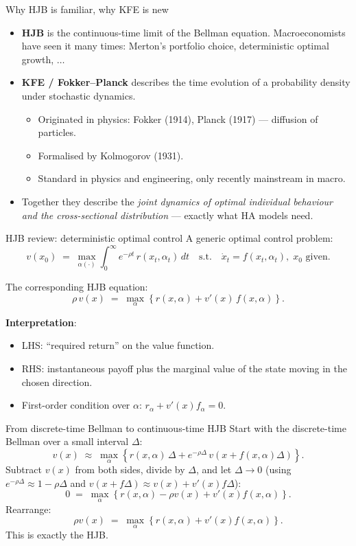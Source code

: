 \documentclass[10pt,english,aspectratio=169]{beamer}
\begin{document}
\begin{frame}{Why HJB is familiar, why KFE is new}
\begin{itemize}
\item \textbf{HJB} is the continuous-time limit of the Bellman equation. Macroeconomists have seen it many times: Merton's portfolio choice, deterministic optimal growth, $\ldots$
\medskip
\item \textbf{KFE / Fokker--Planck} describes the time evolution of a probability density under stochastic dynamics.
  \begin{itemize}
  \item Originated in physics: Fokker (1914), Planck (1917) --- diffusion of particles.
  \item Formalised by Kolmogorov (1931).
  \item Standard in physics and engineering, only recently mainstream in macro.
  \end{itemize}
\medskip
\item Together they describe the \emph{joint dynamics of optimal individual behaviour and the cross-sectional distribution} --- exactly what HA models need.
\end{itemize}
\end{frame}

\begin{frame}{HJB review: deterministic optimal control}
A generic optimal control problem:
\[
v(x_0) \;=\; \max_{\alpha(\cdot)} \int_0^\infty e^{-\rho t}\, r(x_t, \alpha_t)\, dt
\quad\text{s.t.}\quad \dot x_t = f(x_t, \alpha_t),\; x_0 \text{ given}.
\]
\medskip

The corresponding HJB equation:
\[
\rho\, v(x) \;=\; \max_{\alpha}\left\{r(x,\alpha) + v'(x)\,f(x,\alpha)\right\}.
\]
\medskip

\textbf{Interpretation}:
\begin{itemize}
\item LHS: ``required return'' on the value function.
\item RHS: instantaneous payoff plus the marginal value of the state moving in the chosen direction.
\item First-order condition over $\alpha$: $r_\alpha + v'(x) f_\alpha = 0$.
\end{itemize}
\end{frame}

\begin{frame}{From discrete-time Bellman to continuous-time HJB}
Start with the discrete-time Bellman over a small interval $\Delta$:
\[
v(x) \;\approx\; \max_{\alpha}\!\left\{r(x,\alpha)\,\Delta + e^{-\rho\Delta}\, v(x + f(x,\alpha)\Delta)\right\}.
\]
\medskip
Subtract $v(x)$ from both sides, divide by $\Delta$, and let $\Delta \to 0$ (using $e^{-\rho\Delta} \approx 1 - \rho\Delta$ and $v(x + f\Delta) \approx v(x) + v'(x) f\Delta$):
\[
0 \;=\; \max_\alpha\!\left\{r(x,\alpha) - \rho v(x) + v'(x) f(x,\alpha)\right\}.
\]
\medskip
Rearrange:
\[
\rho v(x) \;=\; \max_\alpha\!\left\{r(x,\alpha) + v'(x) f(x,\alpha)\right\}.
\]
\medskip
This is exactly the HJB.
\end{frame}
\end{document}

